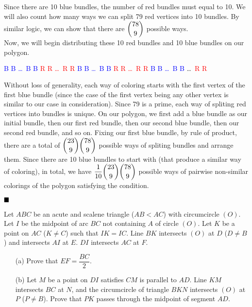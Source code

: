 \documentclass[11pt]{article}
\newenvironment{solution}[1][Solution]{%
  \proof[\normalfont \faPenNib \hspace{0.2cm} \ttfamily \scshape \large #1]%
}{\(\hfill \blacksquare\){\parfillskip0pt\par}}
\theoremstyle{definition}
\begin{document}
\begin{solution}
\begin{enumerate}
                Since there are 10 blue bundles, the number of red bundles must equal to 10. We will also count how many ways we can split 79 red vertices into 10 bundles. By similar logic, we can show that there are \(\dbinom{78}{9}\) possible ways.\\
                Now, we will begin distributing these 10 red bundles and 10 blue bundles on our polygon.
                \begin{center}
                    \textcolor{blue}{B B \dots \ B B} \textcolor{red}{R R \dots \ R R} \textcolor{blue}{B B \dots \ B B} \textcolor{red}{R R \dots \ R R} \textcolor{blue}{B B \dots \ B B} \dots \ \textcolor{red}{R R} \\
                \end{center}
                Without loss of generality, each way of coloring starts with the first vertex of the first blue bundle (since the case of the first vertex being any other vertex is similar to our case in consideration). Since 79 is a prime, each way of spliting red vertices into bundles is unique. On our polygon, we first add a blue bundle as our initial bundle, then our first red bundle, then our second blue bundle, then our second red bundle, and so on. Fixing our first blue bundle, by rule of product, there are a total of \(\dbinom{23}{9} \dbinom{78}{9}\) possible ways of spliting bundles and arrange them. Since there are 10 blue bundles to start with (that produce a similar way of coloring), in total, we have \(\dfrac{1}{10} \dbinom{23}{9} \dbinom{78}{9}\) possible ways of pairwise non-similar colorings of the polygon satisfying the condition.
            \end{enumerate}
        \end{solution}

        \newpage

        \begin{problem}
            Let \(ABC\) be an acute and scalene triangle (\(AB < AC\)) with circumcircle \((O)\). Let \(I\) be the midpoint of arc \(BC\) not containing \(A\) of circle \((O)\). Let \(K\) be a point on \(AC\) (\(K \neq C\)) such that \(IK = IC\). Line \(BK\) intersects \((O)\) at \(D\) (\(D \neq B\)) and intersects \(AI\) at \(E\). \(DI\) intersects \(AC\) at \(F\).
            \begin{enumerate}
                \item[(a)] Prove that \(EF = \dfrac{BC}{2}\).
                \item[(b)] Let \(M\) be a point on \(DI\) satisfies \(CM\) is parallel to \(AD\). Line \(KM\) intersects \(BC\) at \(N\), and the circumcircle of triangle \(BKN\) intersects \((O)\) at \(P\) (\(P \neq B\)). Prove that \(PK\) passes through the midpoint of segment \(AD\).
            \end{enumerate}
        \end{problem}
\end{document}
